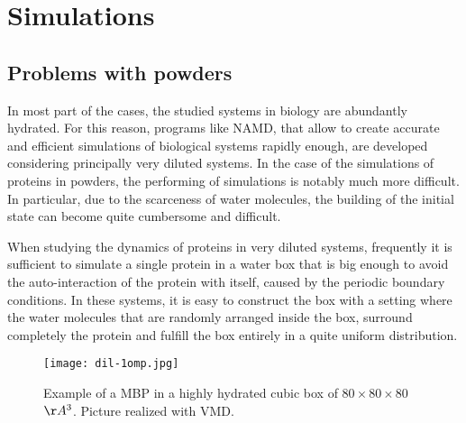 \section{Simulations}
\subsection{Problems with powders}
In most part of the cases, the studied systems in biology are abundantly hydrated. For this reason, programs like NAMD, that allow to create accurate and efficient simulations of biological systems rapidly enough, are developed considering principally very diluted systems. In the case of the simulations of proteins in powders, the performing of simulations is notably much more difficult. In particular, due to the scarceness of water molecules, the building of the initial state can become quite cumbersome and difficult.

When studying the dynamics of proteins in very diluted systems, frequently it is sufficient to simulate a single protein in a water box that is big enough to avoid the auto-interaction of the protein with itself, caused by the periodic boundary conditions. In these systems, it is easy to construct the box with a setting where the water molecules that are randomly arranged inside the box, surround completely the protein and fulfill the box entirely in a quite uniform distribution.

\begin{figure}[H]
\centering
\begin{minipage}[t]{0.7\textwidth}
	\centering
    \texttt{[image: dil-1omp.jpg]}
    
    \footnotesize{\caption{Example of a MBP in a highly hydrated cubic box of $80 \times 80 \times 80$ $\AA^3$. Picture realized with VMD.}
    \label{fig:diluted-syst}
    }
\end{minipage} 
\end{figure}

